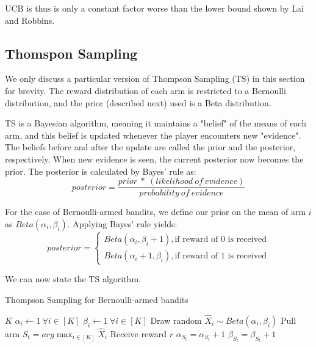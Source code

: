 \documentclass[conference]{IEEEtran}
\begin{document}
UCB is thus is only a constant factor worse than the lower bound shown by Lai and Robbins.

\subsection{Thomspon Sampling}
We only discuss a particular version of Thompson Sampling (TS) in this section for brevity. The reward distribution of each arm is restricted to a Bernoulli distribution, and the prior (described next) used is a Beta distribution.

TS is a Bayesian algorithm, meaning it maintains a "belief" of the means of each arm, and this belief is updated whenever the player encounters new "evidence". The beliefs before and after the update are called the prior and the posterior, respectively. When new evidence is seen, the current posterior now becomes the prior. The posterior is calculated by Bayes' rule as:
\begin{equation*}
    posterior = \dfrac{prior\ *\ (likelihood\ of\ evidence)}{probability\ of\ evidence}
\end{equation*}

For the case of Bernoulli-armed bandits, we define our prior on the mean of arm $i$ as $Beta(\alpha_i, \beta_i)$. Applying Bayes' rule yields:
\begin{equation*}
    posterior = \begin{cases}
    Beta(\alpha_i, \beta_i + 1), \text{if reward of 0 is received}\\
    Beta(\alpha_i + 1, \beta_i), \text{if reward of 1 is received}
    \end{cases}
\end{equation*}

We can now state the TS algorithm.
\begin{algorithm}
\caption{Thompson Sampling for Bernoulli-armed bandits \cite{thompson_sampling}}\label{alg:cap}
\begin{algorithmic}
\Require $K$
\State $\alpha_i \gets 1\ \forall i \in [K]$
\State $\beta_i \gets 1\ \forall i \in [K]$
    \State Draw random $\hat{X}_i \sim Beta(\alpha_i, \beta_i)$
    \EndFor
    \State Pull arm $S_t = arg\max_{i \in [K]} \hat{X}_i$
    \State Receive reward $r$
    \State $\alpha_{S_t} = \alpha_{S_t} + 1$
    \Else
    \State $\beta_{S_t} = \beta_{S_t} + 1$
    \EndIf
\EndFor
\end{algorithmic}
\end{algorithm}
\end{document}
